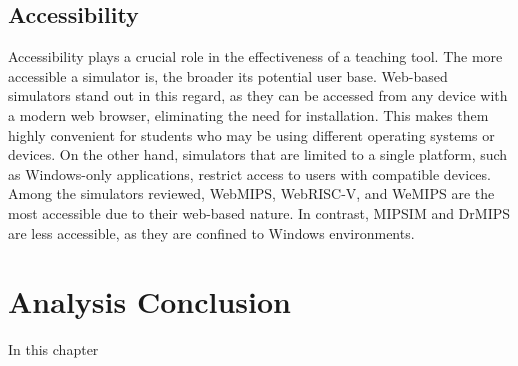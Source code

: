 \subsection{Accessibility}\label{sec:accessibility}
Accessibility plays a crucial role in the effectiveness of a teaching tool. The more accessible a simulator is, the broader its potential user base. Web-based simulators stand out in this regard, as they can be accessed from any device with a modern web browser, eliminating the need for installation. This makes them highly convenient for students who may be using different operating systems or devices. On the other hand, simulators that are limited to a single platform, such as Windows-only applications, restrict access to users with compatible devices. Among the simulators reviewed, WebMIPS, WebRISC-V, and WeMIPS are the most accessible due to their web-based nature. In contrast, MIPSIM and DrMIPS are less accessible, as they are confined to Windows environments.


\section{Analysis Conclusion}
In this chapter 
